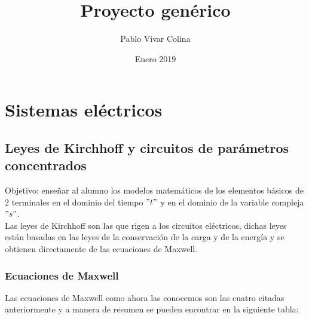 \documentclass[]{article}
\title{Proyecto genérico}
\author{Pablo Vivar Colina}
\date{Enero 2019}
\begin{document}
\maketitle

\tableofcontents  %

\listoffigures  %


\section{Sistemas eléctricos}

\subsection{Leyes de Kirchhoff y circuitos de parámetros concentrados}

Objetivo: enseñar al alumno los modelos matemáticos de los elementos básicos de 2 terminales en el dominio del tiempo $"t"$ y en el dominio de la variable compleja $"s"$.\\

Las leyes de Kirchhoff son las que rigen a los circuitos eléctricos, dichas leyes están basadas en las leyes de la conservación de la carga y de la energía  y se obtienen directamente de las ecuaciones de Maxwell.\\  

\subsubsection{Ecuaciones de Maxwell}

Las ecuaciones de Maxwell como ahora las conocemos son las cuatro citadas anteriormente y a manera de resumen se pueden encontrar en la siguiente tabla:\\
\end{document}
